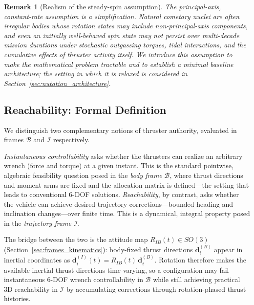 \documentclass{article}
\newtheorem{remark}{Remark}
\begin{document}
\begin{remark}[Realism of the steady-spin assumption]
\label{rem:steady_spin_realism}
The principal-axis, constant-rate assumption is a simplification. Natural cometary nuclei are
often irregular bodies whose rotation states may include non-principal-axis components, and
even an initially well-behaved spin state may not persist over multi-decade mission durations
under stochastic outgassing torques, tidal interactions, and the cumulative effects of
thruster activity itself. We introduce this assumption to make the mathematical problem
tractable and to establish a minimal baseline architecture; the setting in which it is
relaxed is considered in Section~\ref{sec:nutation_architecture}.
\end{remark}


\subsection{Reachability: Formal Definition}
\label{sec:reachability}

We distinguish two complementary notions of thruster authority, evaluated in frames $\mathcal{B}$ and $\mathcal{I}$ respectively.

\emph{Instantaneous controllability} asks whether the thrusters can realize an arbitrary wrench (force and torque) at a given instant. This is the standard pointwise, algebraic feasibility question posed in the \emph{body frame} $\mathcal{B}$, where thrust directions and moment arms are fixed and the allocation matrix is defined---the setting that leads to conventional 6-DOF solutions. \emph{Reachability}, by contrast, asks whether the vehicle can achieve desired trajectory corrections---bounded heading and inclination changes---over finite time. This is a dynamical, integral property posed in the \emph{trajectory frame} $\mathcal{I}$.

The bridge between the two is the attitude map $R_{IB}(t) \in SO(3)$ (Section~\ref{sec:frames_kinematics}): body-fixed thrust directions $\mathbf{d}_i^{(B)}$ appear in inertial coordinates as $\mathbf{d}_i^{(I)}(t) = R_{IB}(t)\,\mathbf{d}_i^{(B)}$. Rotation therefore makes the available inertial thrust directions time-varying, so a configuration may fail instantaneous 6-DOF wrench controllability in $\mathcal{B}$ while still achieving practical 3D reachability in $\mathcal{I}$ by accumulating corrections through rotation-phased thrust histories.
\end{document}
